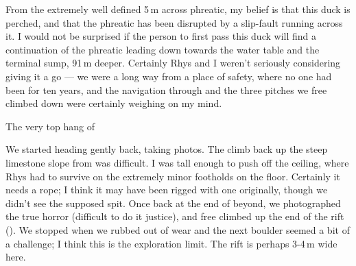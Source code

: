 From the extremely well defined 5\,m across phreatic, my belief is that this duck is perched, and that the phreatic has been disrupted by a slip-fault running across it. I would not be surprised if the person to first pass this duck will find a continuation of the phreatic leading down towards the water table and the terminal sump, 91\,m deeper.
Certainly Rhys and I weren't seriously considering giving it a go --- we were a long way from a place of safety, where no one had been for ten years, and the navigation through  and the three pitches we free climbed down were certainly weighing on my mind.

\begin{marginfigure}
\checkoddpage \ifoddpage \forcerectofloat \else \forceversofloat \fi
\centering
{}
\caption{The very top hang of \protect{}  }
\label{SpaceOdyssey}
\end{marginfigure}

We started heading gently back, taking photos. The climb back up the steep limestone slope from  was difficult. I was tall enough to push off the ceiling, where Rhys had to survive on the extremely minor footholds on the floor. Certainly it needs a rope; I think it may have been rigged with one originally, though we didn't see the supposed spit.
Once back at the end of beyond, we photographed the true horror (difficult to do it justice), and free climbed up the end of the rift (). We stopped when we rubbed out of wear and the next boulder seemed a bit of a challenge; I think this is the exploration limit. The rift is perhaps 3-4\,m wide here.

